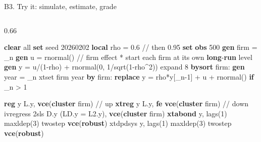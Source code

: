 \documentclass[
  11pt,
  ignorenonframetext,
  aspectratio=169,
]{beamer}
\newenvironment{Shaded}{\begin{snugshade}}{\end{snugshade}}
\newcommand{\BaseNTok}[1]{\textcolor[rgb]{0.68,0.00,0.00}{#1}}
\newcommand{\CommentTok}[1]{\textcolor[rgb]{0.37,0.37,0.37}{#1}}
\newcommand{\DataTypeTok}[1]{\textcolor[rgb]{0.68,0.00,0.00}{#1}}
\newcommand{\DecValTok}[1]{\textcolor[rgb]{0.68,0.00,0.00}{#1}}
\newcommand{\FunctionTok}[1]{\textcolor[rgb]{0.28,0.35,0.67}{#1}}
\newcommand{\KeywordTok}[1]{\textcolor[rgb]{0.00,0.23,0.31}{\textbf{#1}}}
\newcommand{\NormalTok}[1]{\textcolor[rgb]{0.00,0.23,0.31}{#1}}
\newcommand{\OtherTok}[1]{\textcolor[rgb]{0.00,0.23,0.31}{#1}}
\begin{document}
\begin{frame}[fragile]{B3. Try it: simulate, estimate, grade}
\protect{}\label{b3.-try-it-simulate-estimate-grade}
\begin{columns}[T]
\begin{column}{0.66\linewidth}
\begin{Shaded}
\begin{Highlighting}[]
\KeywordTok{clear} \OtherTok{all}
\KeywordTok{set} \DecValTok{seed}\NormalTok{ 20260202}
\KeywordTok{local}\NormalTok{ rho = 0.6                      }\CommentTok{// then 0.95}
\KeywordTok{set} \KeywordTok{obs}\NormalTok{ 500}
\KeywordTok{gen}\NormalTok{ firm = }\DataTypeTok{\_n}
\KeywordTok{gen}\NormalTok{ u = rnormal()                    }\CommentTok{// firm effect}
\NormalTok{* }\BaseNTok{start}\NormalTok{ each firm }\FunctionTok{at}\NormalTok{ its own }\KeywordTok{long}\NormalTok{{-}}\KeywordTok{run} \DecValTok{level}
\KeywordTok{gen} \FunctionTok{y}\NormalTok{ = u/(1{-}}\OtherTok{\textasciigrave{}rho\textquotesingle{}}\NormalTok{) + rnormal(0, 1/}\FunctionTok{sqrt}\NormalTok{(1{-}}\OtherTok{\textasciigrave{}rho\textquotesingle{}}\NormalTok{\^{}2))}
\NormalTok{expand 8}
\KeywordTok{bysort}\NormalTok{ firm: }\KeywordTok{gen} \FunctionTok{year}\NormalTok{ = }\DataTypeTok{\_n}
\NormalTok{xtset firm }\FunctionTok{year}
\KeywordTok{by}\NormalTok{ firm: }\KeywordTok{replace} \FunctionTok{y}\NormalTok{ = }\OtherTok{\textasciigrave{}rho\textquotesingle{}}\NormalTok{*}\FunctionTok{y}\NormalTok{[}\DataTypeTok{\_n}\NormalTok{{-}1] + u + rnormal() }\KeywordTok{if} \DataTypeTok{\_n}\NormalTok{ \textgreater{} 1}

\KeywordTok{reg}   \FunctionTok{y}\NormalTok{ L.}\FunctionTok{y}\NormalTok{, }\KeywordTok{vce}\NormalTok{(}\KeywordTok{cluster}\NormalTok{ firm)                    }\CommentTok{// up}
\KeywordTok{xtreg} \FunctionTok{y}\NormalTok{ L.}\FunctionTok{y}\NormalTok{, }\KeywordTok{fe} \KeywordTok{vce}\NormalTok{(}\KeywordTok{cluster}\NormalTok{ firm)                 }\CommentTok{// down}
\NormalTok{ivregress 2sls D.}\FunctionTok{y}\NormalTok{ (LD.}\FunctionTok{y}\NormalTok{ = L2.}\FunctionTok{y}\NormalTok{), }\KeywordTok{vce}\NormalTok{(}\KeywordTok{cluster}\NormalTok{ firm)}
\KeywordTok{xtabond}  \FunctionTok{y}\NormalTok{, lags(1) maxldep(3) twostep }\KeywordTok{vce}\NormalTok{(}\KeywordTok{robust}\NormalTok{)}
\NormalTok{xtdpdsys }\FunctionTok{y}\NormalTok{, lags(1) maxldep(3) twostep }\KeywordTok{vce}\NormalTok{(}\KeywordTok{robust}\NormalTok{)}
\end{Highlighting}
\end{Shaded}
\end{column}


\end{columns}
\end{frame}
\end{document}
